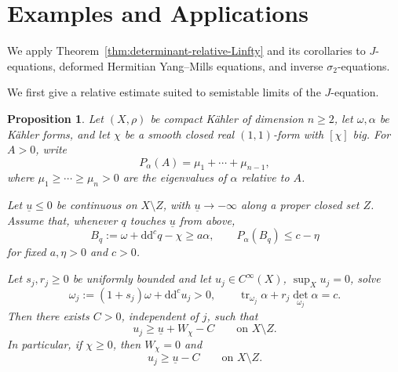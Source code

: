 \documentclass[oneside,english,letterpaper]{amsart}
\numberwithin{equation}{section}
\theoremstyle{plain}
\newtheorem{prop}[thm]{Proposition}
\theoremstyle{definition}
\theoremstyle{remark}
\renewcommand{\d}{\mathrm{d}}
\newcommand{\ddc}{\d\d^c}
\def\tr{\operatorname{tr}}
\begin{document}
\section{Examples and Applications}
\label{sec:examples-applications}

We apply Theorem~\ref{thm:determinant-relative-Linfty} and its
corollaries to $J$-equations, deformed Hermitian Yang--Mills
equations, and inverse $\sigma_2$-equations.

We first give a relative estimate suited to semistable limits of the $J$-equation.

\begin{prop}
\label{prop:J-relative}
Let $(X,\rho)$ be compact K\"ahler of dimension $n\geq 2$, let
$\omega,\alpha$ be K\"ahler forms, and let $\chi$ be a smooth closed real
$(1,1)$-form with $[\chi]$ big. For $A>0$, write
$$
P_\alpha(A)=\mu_1+\cdots+\mu_{n-1},
$$
where $\mu_1\geq\cdots\geq\mu_n>0$ are the eigenvalues of $\alpha$
relative to $A$.

Let $\underline u\leq 0$ be continuous on $X\setminus Z$, with
$\underline u\to-\infty$ along a proper closed set $Z$. Assume that,
whenever $q$ touches $\underline u$ from above,
$$
B_q:=\omega+\ddc q-\chi\geq a\alpha,
\qquad
P_\alpha(B_q)\leq c-\eta
$$
for fixed $a,\eta>0$ and $c>0$.

Let $s_j,r_j\geq 0$ be uniformly bounded and let
$u_j\in C^\infty(X)$, $\sup_Xu_j=0$, solve
$$
\omega_j:=(1+s_j)\omega+\ddc u_j>0,
\qquad
\tr_{\omega_j}\alpha+r_j\det_{\omega_j}\alpha=c.
$$
Then there exists $C>0$, independent of $j$, such that
$$
u_j\geq \underline u+W_\chi-C
\qquad\text{on }X\setminus Z.
$$
In particular, if $\chi\geq 0$, then $W_\chi=0$ and
$$
u_j\geq \underline u-C
\qquad\text{on }X\setminus Z.
$$
\end{prop}
\end{document}
